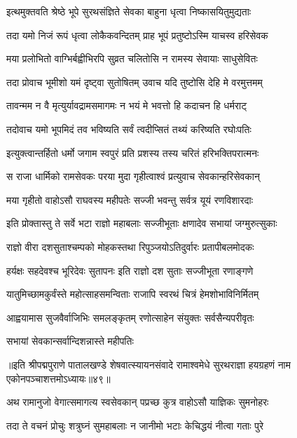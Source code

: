 \twolineshloka
{इत्थमुक्तवति श्रेष्ठे भूपे सुरथसंज्ञिते}
{सेवका बाहुना धृत्वा निष्कासयितुमुद्यताः}%

\twolineshloka
{तदा यमो निजं रूपं धृत्वा लोकैकवन्दितम्}
{प्राह भूपं प्रतुष्टोऽस्मि याचस्व हरिसेवक}%

\twolineshloka
{मया प्रलोभितो वाग्भिर्बह्वीभिरपि सुव्रत}
{चलितोसि न रामस्य सेवायाः साधुसेवितः}%

\twolineshloka
{तदा प्रोवाच भूमीशो यमं दृष्ट्वा सुतोषितम्}
{उवाच यदि तुष्टोसि देहि मे वरमुत्तमम्}%

\twolineshloka
{तावन्मम न वै मृत्युर्यावद्रामसमागमः}
{न भयं मे भवत्तो हि कदाचन हि धर्मराट्}%

\twolineshloka
{तदोवाच यमो भूपमिदं तव भविष्यति}
{सर्वं त्वदीप्सितं तथ्यं करिष्यति रघोःपतिः}%

\twolineshloka
{इत्युक्त्वान्तर्हितो धर्मो जगाम स्वपुरं प्रति}
{प्रशस्य तस्य चरितं हरिभक्तिपरात्मनः}%

\twolineshloka
{स राजा धार्मिको रामसेवकः परया मुदा}
{गृहीत्वाश्वं प्रत्युवाच सेवकान्हरिसेवकान्}%

\twolineshloka
{मया गृहीतो वाहोऽसौ राघवस्य महीपतेः}
{सज्जी भवन्तु सर्वत्र यूयं रणविशारदाः}%

\twolineshloka
{इति प्रोक्तास्तु ते सर्वे भटा राज्ञो महाबलाः}
{सज्जीभूताः क्षणादेव सभायां जग्मुरुत्सुकाः}%

\twolineshloka
{राज्ञो वीरा दशसुताश्चम्पको मोहकस्तथा}
{रिपुञ्जयोऽतिदुर्वारः प्रतापीबलमोदकः}%

\twolineshloka
{हर्यक्षः सहदेवश्च भूरिदेवः सुतापनः}
{इति राज्ञो दश सुताः सज्जीभूता रणाङ्गणे}%

\twolineshloka
{यातुमिच्छामकुर्वंस्ते महोत्साहसमन्विताः}
{राजापि स्वरथं चित्रं हेमशोभाविनिर्मितम्}%

\twolineshloka
{आह्वयामास सुजवैर्वाजिभिः समलङ्कृतम्}
{रणोत्साहेन संयुक्तः सर्वसैन्यपरीवृतः}%

\onelineshloka
{सभायां सेवकान्सर्वान्दिशन्नास्ते महीपतिः}%

॥इति श्रीपद्मपुराणे पातालखण्डे शेषवात्स्यायनसंवादे रामाश्वमेधे सुरथराज्ञा हयग्रहणं नाम एकोनपञ्चाशत्तमोऽध्यायः॥४९॥



\twolineshloka
{अथ रामानुजो वेगात्समागत्य स्वसेवकान्}
{पप्रच्छ कुत्र वाहोऽसौ याज्ञिकः सुमनोहरः}%

\twolineshloka
{तदा ते वचनं प्रोचुः शत्रुघ्नं सुमहाबलाः}
{न जानीमो भटाः केचिद्धयं नीत्वा गताः पुरे}%

